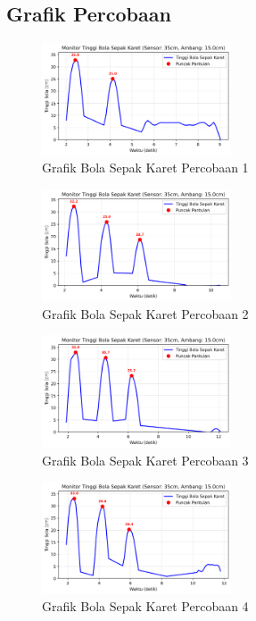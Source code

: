 \subsection{Grafik Percobaan}
\begin{figure}[htbp]
    \centering
    \includegraphics[width=0.5\textwidth]{chapters/DataPercobaan/Grafik_Bola_Sepak_Karet_1.png}
    \caption{Grafik Bola Sepak Karet Percobaan 1}
\end{figure}
\begin{figure}[htbp]
    \centering
    \includegraphics[width=0.5\textwidth]{chapters/DataPercobaan/Grafik_Bola_Sepak_Karet_2.png}
    \caption{Grafik Bola Sepak Karet Percobaan 2}
\end{figure}
\begin{figure}[htbp]
    \centering
    \includegraphics[width=0.5\textwidth]{chapters/DataPercobaan/Grafik_Bola_Sepak_Karet_3.png}
    \caption{Grafik Bola Sepak Karet Percobaan 3}
\end{figure}
\begin{figure}[htbp]
    \centering
    \includegraphics[width=0.5\textwidth]{chapters/DataPercobaan/Grafik_Bola_Sepak_Karet_4.png}
    \caption{Grafik Bola Sepak Karet Percobaan 4}
\end{figure}

